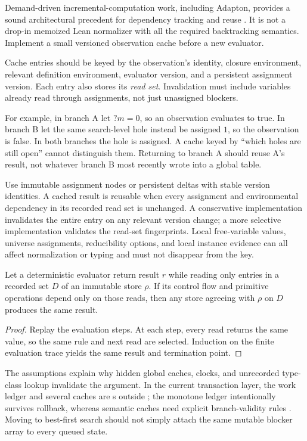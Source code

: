 \ans Demand-driven incremental-computation work, including Adapton, provides a sound architectural precedent for dependency tracking and reuse \cite{adapton}. It is not a drop-in memoized Lean normalizer with all the required backtracking semantics. Implement a small versioned observation cache before a new evaluator.

Cache entries should be keyed by the observation's identity, closure environment, relevant definition environment, evaluator version, and a persistent assignment version. Each entry also stores its \emph{read set}. Invalidation must include variables already read through assignments, not just unassigned blockers.

For example, in branch A let $?m=0$, so an observation evaluates to true. In branch B let the same search-level hole instead be assigned $1$, so the observation is false. In both branches the hole is assigned. A cache keyed by ``which holes are still open'' cannot distinguish them. Returning to branch A should reuse A's result, not whatever branch B most recently wrote into a global table.

Use immutable assignment nodes or persistent deltas with stable version identities. A cached result is reusable when every assignment and environmental dependency in its recorded read set is unchanged. A conservative implementation invalidates the entire entry on any relevant version change; a more selective implementation validates the read-set fingerprints. Local free-variable values, universe assignments, reducibility options, and local instance evidence can all affect normalization or typing and must not disappear from the key.

\begin{proposition}
Let a deterministic evaluator return result $r$ while reading only entries in a recorded set $D$ of an immutable store $\rho$. If its control flow and primitive operations depend only on those reads, then any store agreeing with $\rho$ on $D$ produces the same result.
\end{proposition}
\begin{proof}
Replay the evaluation steps. At each step, every read returns the same value, so the same rule and next read are selected. Induction on the finite evaluation trace yields the same result and termination point.
\end{proof}

The assumptions explain why hidden global caches, clocks, and unrecorded type-class lookup invalidate the argument. In the current transaction layer, the work ledger and several caches are s outside ; the monotone ledger intentionally survives rollback, whereas semantic caches need explicit branch-validity rules \cite{transaction,searchcore}. Moving to best-first search should not simply attach the same mutable blocker array to every queued state.

